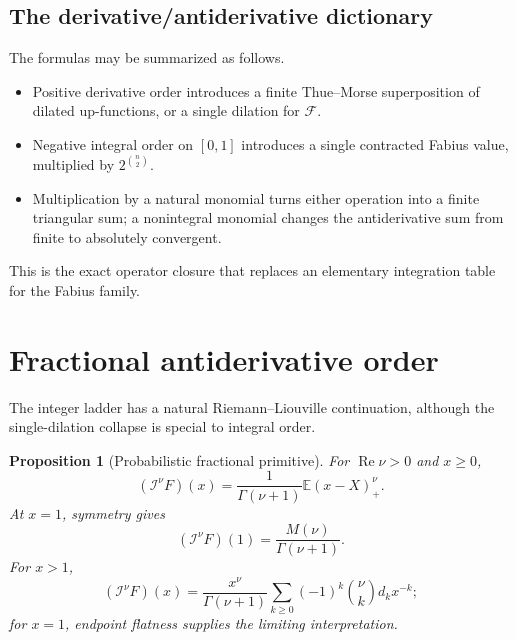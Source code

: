 \documentclass[11pt,oneside]{article}
\newtheorem{proposition}[theorem]{Proposition}
\theoremstyle{definition}
\theoremstyle{remark}
\newcommand{\Fs}{\mathcal F}
\newcommand{\E}{\mathbb E}
\newcommand{\RL}{\mathcal I}
\newcommand{\1}{\mathbf 1}
\DeclareMathOperator{\Rea}{Re}
\begin{document}
\subsection{The derivative/antiderivative dictionary}
The formulas may be summarized as follows.
\begin{itemize}
\item Positive derivative order introduces a finite Thue--Morse superposition
      of dilated up-functions, or a single dilation for \(\Fs\).
\item Negative integral order on \([0,1]\) introduces a single contracted
      Fabius value, multiplied by \(2^{\binom n2}\).
\item Multiplication by a natural monomial turns either operation into a finite
      triangular sum; a nonintegral monomial changes the antiderivative sum
      from finite to absolutely convergent.
\end{itemize}
This is the exact operator closure that replaces an elementary integration
table for the Fabius family.

\section{Fractional antiderivative order}

The integer ladder has a natural Riemann--Liouville continuation, although the
single-dilation collapse is special to integral order.

\begin{proposition}[Probabilistic fractional primitive]\label{p1:prop:fractional-F}
For \(\Rea\nu>0\) and \(x\geq0\),
\begin{equation}
 \boxed{\quad
 (\RL^\nu F)(x)=\frac1{\Gamma(\nu+1)}\E (x-X)_+^\nu.
 \quad}                                                        \label{p1:eq:fractional-stoploss}
\end{equation}
At \(x=1\), symmetry gives
\begin{equation}
 (\RL^\nu F)(1)=\frac{M(\nu)}{\Gamma(\nu+1)}.                  \label{p1:eq:fractional-one}
\end{equation}
For \(x>1\),
\begin{equation}
 (\RL^\nu F)(x)=\frac{x^\nu}{\Gamma(\nu+1)}
 \sum_{k\geq0}(-1)^k\binom\nu k d_kx^{-k};                    \label{p1:eq:fractional-exterior}
\end{equation}
for \(x=1\), endpoint flatness supplies the limiting interpretation.
\end{proposition}
\end{document}
